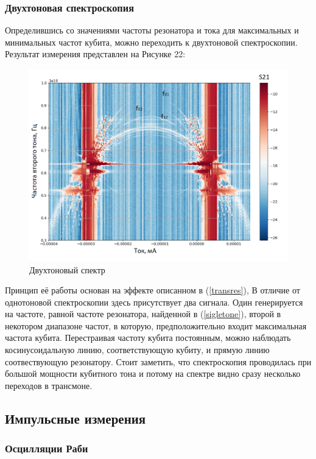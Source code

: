 \subsubsection{Двухтоновая спектроскопия}
Определившись со значениями частоты резонатора и тока для максимальных и минимальных частот кубита, можно переходить к двухтоновой спектроскопии. Результат измерения представлен на Рисунке 22: 
\begin{figure}[!h]
	\centering
	\includegraphics[width=0.8\linewidth]{pictures/2tone6_39}
	\caption{Двухтоновый спектр}
	\label{fig:2tone639}
\end{figure}

Принцип её работы основан на эффекте описанном в (\ref{transres}), В отличие от однотоновой спектроскопии здесь присутствует два сигнала. Один генерируется на частоте, равной частоте резонатора, найденной в (\ref{sigletone}), второй в некотором диапазоне частот, в которую, предположительно входит максимальная частота кубита. Перестраивая частоту кубита постоянным, можно наблюдать косинусоидальную линию, соответствующую кубиту, и прямую линию соотвествующую резонатору. Стоит заметить, что спектроскопия проводилась при большой мощности кубитного тона и потому на спектре видно сразу несколько переходов в трансмоне. 

\subsection{Импульсные измерения}
\subsubsection{Осцилляции Раби}

